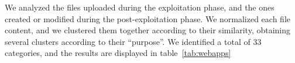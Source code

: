 We analyzed the files uploaded during the exploitation phase, and the ones created or modified during the post-exploitation phase. We normalized each file content, and we clustered them together according to their similarity, obtaining several clusters according to their ``purpose''. We identified a total of 33 categories, and the results are displayed in table~\ref{tab:webapps}
